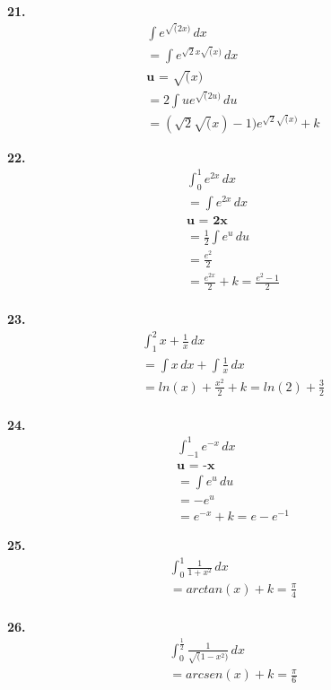 \documentclass{article}
\begin{document}
\textbf{21.}
\begin{gather*}
    \int e^{\sqrt(2x)}\,dx
\\
    = \int e^{\sqrt2x\sqrt(x)}\,dx
\\
    \textbf{u = } \sqrt(x)
\\
    = 2\int ue^{\sqrt(2u)}\,du
\\
    = (\sqrt2\sqrt(x) - 1) e^{\sqrt2\sqrt(x)} + k
\end{gather*}

\textbf{22.}
\begin{gather*}
    \int_{0}^{1} e^{2x} \,dx
\\
    = \int e^{2x}\,dx
\\
    \textbf{u = 2x}
\\
    = \frac{1}{2} \int e^u \,du
\\
    = \frac{e^2}{2}
\\
    = \frac{e^{2x}}{2} + k = \frac{e^2-1}{2}
\\ 
\end{gather*}

\textbf{23.}
\begin{gather*}
    \int_{1}^{2} x+\frac{1}{x} \,dx
\\
    = \int x\,dx + \int \frac{1}{x}\,dx
\\
    = ln(x) + \frac{x^2}{2} + k = ln(2) + \frac{3}{2}
\\
\end{gather*}

\textbf{24.}
\begin{gather*}
    \int_{-1}^{1} e^{-x} \,dx
\\
    \textbf{u = -x}
\\
    = \int e^u \,du
\\
    = -e^u
\\ 
    = e^{-x} +k = e - e^{-1}
\end{gather*}

\textbf{25.}
\begin{gather*}
    \int_{0}^{1} \frac{1}{1+x^2} \,dx
\\
    = arctan(x) + k = \frac{\pi}{4}
\\
\end{gather*}

\textbf{26.}
\begin{gather*}
    \int_{0}^{\frac{1}{2}} \frac{1}{\sqrt(1 - x^2)} \,dx
\\
    = arcsen(x) + k = \frac{\pi}{6}
\\
\end{gather*}
\end{document}
